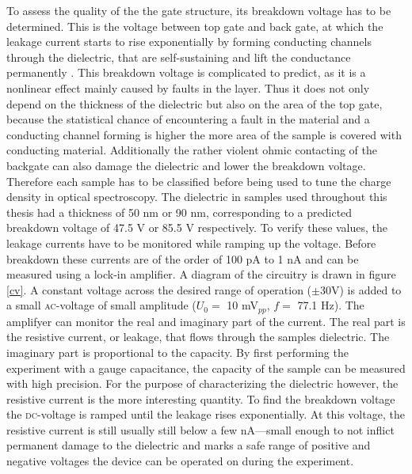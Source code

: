 To assess the quality of the the gate structure, its breakdown voltage has to be determined. This is the voltage between top gate and back gate, at which the leakage current starts to rise exponentially by forming conducting channels through the dielectric, that are self-sustaining and lift the conductance permanently \cite{klein_maximum_1966}. This breakdown voltage is complicated to predict, as it is a nonlinear effect mainly caused by faults in the \sio layer. Thus it does not only depend on the thickness of the dielectric but also on the area of the top gate, because the statistical chance of encountering a fault in the material and a conducting channel forming is higher the more area of the sample is covered with conducting material. Additionally the rather violent ohmic contacting of the backgate can also damage the dielectric and lower the breakdown voltage. Therefore each sample has to be classified before being used to tune the charge density in optical spectroscopy. The dielectric in samples used throughout this thesis had a thickness of 50 nm or 90 nm, corresponding to a predicted breakdown voltage of 47.5 V or 85.5 V respectively. To verify these values, the leakage currents have to be monitored while ramping up the voltage. Before breakdown these currents are of the order of 100 pA to 1 nA and can be measured using a lock-in amplifier. A diagram of the circuitry is drawn in figure \ref{cv}. A constant voltage across the desired range of operation ({\small$\pm $}30V) is added to a small \textsc{ac}-voltage of small amplitude ($U_0 = $ 10 mV$_{pp}$, $f = $ 77.1 Hz). The amplifyer can monitor the real and imaginary part of the current. The real part is the resistive current, or leakage, that flows through the samples dielectric. The imaginary part is proportional to the capacity. By first performing the experiment with a gauge capacitance, the capacity of the sample can be measured with high precision. For the purpose of characterizing the dielectric however, the resistive current is the more interesting quantity. To find the breakdown voltage the \textsc{dc}-voltage is ramped until the leakage rises exponentially. At this voltage, the resistive current is still usually still below a few nA---small enough to not inflict permanent damage to the dielectric and marks a safe range of positive and negative voltages the device can be operated on during the experiment.

